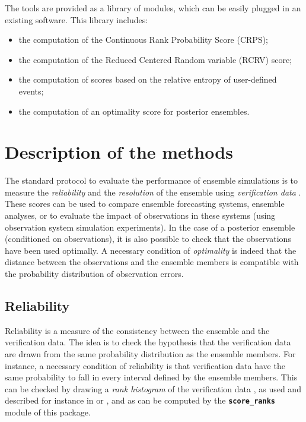 \documentclass[11pt]{article}
\begin{document}
The tools are provided as a library of modules,
which can be easily plugged in an existing software.
This library includes:

\begin{itemize}
\item the computation of the Continuous Rank Probability Score (CRPS);
\item the computation of the Reduced Centered Random variable (RCRV) score;
\item the computation of scores based on the relative entropy of user-defined events;
\item the computation of an optimality score for posterior ensembles.
\end{itemize}

\clearpage

\pagestyle{plain}

\section{Description of the methods}

The standard protocol to evaluate the performance of ensemble simulations
is to measure the {\em reliability} and the {\em resolution} of the ensemble
using {\em verification data} \citep{TOTH03,CAND05,CAND07}.
These scores can be used to compare ensemble forecasting systems,
ensemble analyses, or to evaluate the impact of observations in these systems
(using observation system simulation experiments).
In the case of a posterior ensemble (conditioned on observations),
it is also possible to check that the observations have been used optimally.
A necessary condition of {\em optimality} is indeed that the distance
between the observations and the ensemble members
is compatible with the probability distribution of observation errors.

\subsection{Reliability}

Reliability is a measure of the consistency between the ensemble and the verification data.
The idea is to check the hypothesis that the verification data
are drawn from the same probability distribution as the ensemble members.
For instance, a necessary condition of reliability is that
verification data have the same probability to fall in every interval
defined by the ensemble members.
This can be checked by drawing a {\em rank histogram} of the verification data \citep{ANDE96},
as used and described for instance in \citet{CAND15} or \citet{GARN16}, and
as can be computed by the {\tt\bf score\_ranks} module of this package.
\end{document}

